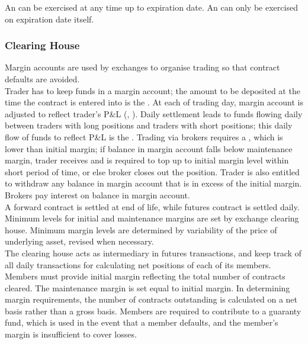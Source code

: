 \begin{definition} An  can be exercised at any time up to expiration date. An  can only be exercised on expiration date itself.
\end{definition}

\subsubsection{Clearing House}

Margin accounts are used by exchanges to organise trading so that contract defaults are avoided. \\
Trader has to keep funds in a margin account; the amount to be deposited at the time the contract is entered into is the . At each of trading day, margin account is adjusted to reflect trader's P\&L (, ). Daily settlement leads to funds flowing daily between traders with long positions and traders with short positions; this daily flow of funds to reflect P\&L is the . Trading via brokers requires a , which is lower than initial margin; if balance in margin account falls below maintenance margin, trader receives  and is required to top up to initial margin level within short period of time, or else broker closes out the position. Trader is also entitled to withdraw any balance in margin account that is in excess of the initial margin. Brokers pay interest on balance in margin account.\\
A forward contract is settled at end of life, while futures contract is settled daily. Minimum levels for initial and maintenance margins are set by exchange clearing house. Minimum margin levels are determined by variability of the price of underlying asset, revised when necessary.\\

The clearing house acts as intermediary in futures transactions, and keep track of all daily transactions for calculating net positions of each of its members. Members must provide initial margin reflecting the total number of contracts cleared. The maintenance margin is set equal to initial margin. In determining margin requirements, the number of contracts outstanding is calculated on a net basis rather than a gross basis. Members are required to contribute to a guaranty fund, which is used in the event that a member defaults, and the member's margin is insufficient to cover losses.

